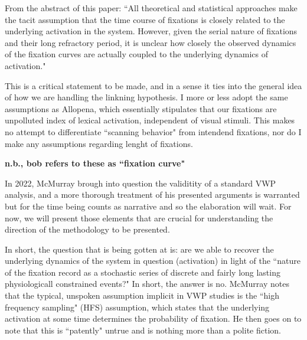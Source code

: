 \documentclass{article}
\begin{document}
From the abstract of this paper: ``All theoretical and statistical approaches make the tacit assumption that the time course of fixations is closely related to the underlying activation in the system. However, given the serial nature of fixations and their long refractory period, it is unclear how closely the observed dynamics of the fixation curves are actually coupled to the underlying dynamics of activation."


This is a critical statement to be made, and in a sense it ties into the general idea of how we are handling the linkning hypothesis. I more or less adopt the same assumptions as Allopena, which essentially stipulates that our fixations are unpolluted index of lexical activation, independent of visual stimuli. This makes no attempt to differentiate ``scanning behavior" from intendend fixations, nor do I make any assumptions regarding lenght of fixations.


\textbf{n.b., bob refers to these as ``fixation curve"}

In 2022, McMurray brough into question the validitity of a standard VWP analysis, and a more thorough treatment of his presented arguments is warranted but for the time being counts as narrative and so the elaboration will wait. For now, we will present those elements that are crucial for understanding the direction of the methodology to be presented.

In short, the question that is being gotten at is: are we able to recover the underlying dynamics of the system in question (activation) in light of the ``nature of the fixation record as a stochastic series of discrete and fairly long lasting physiologicall constrained events?" In short, the answer is no. McMurray notes that the typical, unspoken assumption implicit in VWP studies is the ``high frequency sampling" (HFS) assumption, which states that the underlying activation at some time determines the probability of fixation. He then goes on to note that this is ``patently" untrue and is nothing more than a polite fiction.
\end{document}
